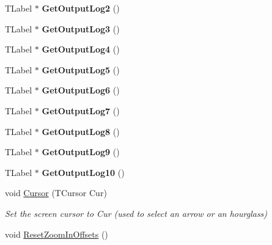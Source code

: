 \begin{DoxyCompactItemize}
T\+Label $\ast$ {\bfseries Get\+Output\+Log2} ()
\item 
\mbox{\label{class_t_display_a1e134169a934d995afa8fc6cb2d5dba3}} 
T\+Label $\ast$ {\bfseries Get\+Output\+Log3} ()
\item 
\mbox{\label{class_t_display_aba802332a11229140ce5871c0b6cc6f7}} 
T\+Label $\ast$ {\bfseries Get\+Output\+Log4} ()
\item 
\mbox{\label{class_t_display_a890f6524c617a499ddf6a33dedd402d5}} 
T\+Label $\ast$ {\bfseries Get\+Output\+Log5} ()
\item 
\mbox{\label{class_t_display_a6195645236a8467bb91251ebc05e7aaa}} 
T\+Label $\ast$ {\bfseries Get\+Output\+Log6} ()
\item 
\mbox{\label{class_t_display_abd6048be9875c6a05d5e03dafad392eb}} 
T\+Label $\ast$ {\bfseries Get\+Output\+Log7} ()
\item 
\mbox{\label{class_t_display_a6b64227ebcf1e3d89ab7b91935b34418}} 
T\+Label $\ast$ {\bfseries Get\+Output\+Log8} ()
\item 
\mbox{\label{class_t_display_a3c0d9e395bca910692d99bf290003a82}} 
T\+Label $\ast$ {\bfseries Get\+Output\+Log9} ()
\item 
\mbox{\label{class_t_display_af3539f02f6a316b418aa5536cf52649c}} 
T\+Label $\ast$ {\bfseries Get\+Output\+Log10} ()
\item 
\mbox{\label{class_t_display_abf4de4c2478e8e9d29316fa0e2b6cf8c}} 
void \mbox{\hyperlink{class_t_display_abf4de4c2478e8e9d29316fa0e2b6cf8c}{Cursor}} (T\+Cursor Cur)
\begin{DoxyCompactList}\small\item\em Set the screen cursor to \textquotesingle{}Cur\textquotesingle{} (used to select an arrow or an hourglass) \end{DoxyCompactList}\item 
\mbox{\label{class_t_display_adc2d6f29794735d5fdebd7b2dbece95d}} 
void \mbox{\hyperlink{class_t_display_adc2d6f29794735d5fdebd7b2dbece95d}{Reset\+Zoom\+In\+Offsets}} ()

\end{DoxyCompactItemize}
